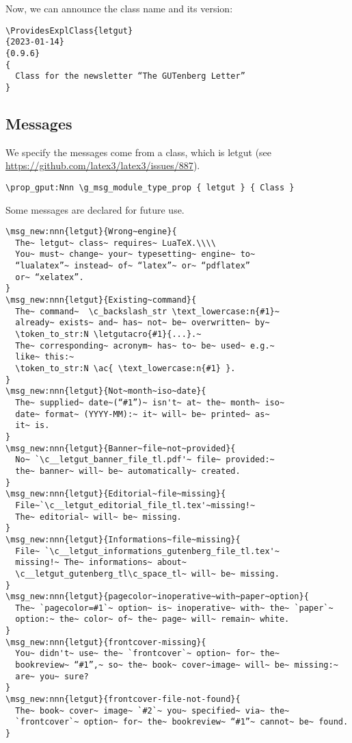 \documentclass{letgut}
\begin{document}
Now, we can announce the class name and its version:

\begin{lstlisting}
\ProvidesExplClass{letgut}
{2023-01-14}
{0.9.6}
{
  Class for the newsletter “The GUTenberg Letter”
}
\end{lstlisting}

\subsection{Messages}
\label{ImplementationMessages-xg7g55h0jlj0}
We specify the messages come from a class, which is letgut (see
\url{https://github.com/latex3/latex3/issues/887}).

\begin{lstlisting}
\prop_gput:Nnn \g_msg_module_type_prop { letgut } { Class }
\end{lstlisting}

Some messages are declared for future use.

\begin{lstlisting}
\msg_new:nnn{letgut}{Wrong~engine}{
  The~ letgut~ class~ requires~ LuaTeX.\\\\
  You~ must~ change~ your~ typesetting~ engine~ to~
  “lualatex”~ instead~ of~ “latex”~ or~ “pdflatex”
  or~ “xelatex”.
}
\msg_new:nnn{letgut}{Existing~command}{
  The~ command~  \c_backslash_str \text_lowercase:n{#1}~
  already~ exists~ and~ has~ not~ be~ overwritten~ by~
  \token_to_str:N \letgutacro{#1}{...}.~
  The~ corresponding~ acronym~ has~ to~ be~ used~ e.g.~
  like~ this:~
  \token_to_str:N \ac{ \text_lowercase:n{#1} }.
}
\msg_new:nnn{letgut}{Not~month~iso~date}{
  The~ supplied~ date~(“#1”)~ isn't~ at~ the~ month~ iso~
  date~ format~ (YYYY-MM):~ it~ will~ be~ printed~ as~
  it~ is.
}
\msg_new:nnn{letgut}{Banner~file~not~provided}{
  No~ `\c__letgut_banner_file_tl.pdf'~ file~ provided:~
  the~ banner~ will~ be~ automatically~ created.
}
\msg_new:nnn{letgut}{Editorial~file~missing}{
  File~`\c__letgut_editorial_file_tl.tex'~missing!~
  The~ editorial~ will~ be~ missing.
}
\msg_new:nnn{letgut}{Informations~file~missing}{
  File~ `\c__letgut_informations_gutenberg_file_tl.tex'~
  missing!~ The~ informations~ about~
  \c__letgut_gutenberg_tl\c_space_tl~ will~ be~ missing.
}
\msg_new:nnn{letgut}{pagecolor~inoperative~with~paper~option}{
  The~ `pagecolor=#1`~ option~ is~ inoperative~ with~ the~ `paper`~
  option:~ the~ color~ of~ the~ page~ will~ remain~ white.
}
\msg_new:nnn{letgut}{frontcover-missing}{
  You~ didn't~ use~ the~ `frontcover`~ option~ for~ the~
  bookreview~ “#1”,~ so~ the~ book~ cover~image~ will~ be~ missing:~
  are~ you~ sure?
}
\msg_new:nnn{letgut}{frontcover-file-not-found}{
  The~ book~ cover~ image~ `#2`~ you~ specified~ via~ the~
  `frontcover`~ option~ for~ the~ bookreview~ “#1”~ cannot~ be~ found.
}
\end{lstlisting}
\end{document}
